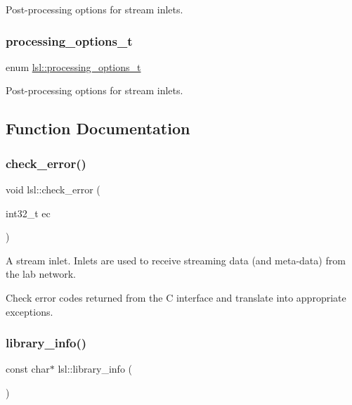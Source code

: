 Post-\/processing options for stream inlets. \mbox{\label{namespacelsl_aaa1cffa7d29bb2756522bc2bb069e310}} 
\subsubsection{\texorpdfstring{processing\+\_\+options\+\_\+t}{processing\_options\_t}}
{\footnotesize\ttfamily enum \hyperlink{namespacelsl_aaa1cffa7d29bb2756522bc2bb069e310}{lsl\+::processing\+\_\+options\+\_\+t}}

Post-\/processing options for stream inlets. 

\subsection{Function Documentation}
\mbox{\label{namespacelsl_acce0545ac0a7831acde1a759b778393c}} 
\subsubsection{\texorpdfstring{check\+\_\+error()}{check\_error()}}
{\footnotesize\ttfamily void lsl\+::check\+\_\+error (\begin{DoxyParamCaption}\item[{int32\+\_\+t}]{ec }\end{DoxyParamCaption})\hspace{0.3cm}{\ttfamily [inline]}}

A stream inlet. Inlets are used to receive streaming data (and meta-\/data) from the lab network.

Check error codes returned from the C interface and translate into appropriate exceptions. \mbox{\label{namespacelsl_a2a348cf022e9862396e4a10f60af42e9}} 
\subsubsection{\texorpdfstring{library\+\_\+info()}{library\_info()}}
{\footnotesize\ttfamily const char$\ast$ lsl\+::library\+\_\+info (\begin{DoxyParamCaption}{ }\end{DoxyParamCaption})\hspace{0.3cm}{\ttfamily [inline]}}

